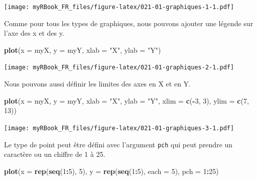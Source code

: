 \documentclass[]{book}
\newenvironment{Shaded}{\begin{snugshade}}{\end{snugshade}}
\newcommand{\DataTypeTok}[1]{\textcolor[rgb]{0.13,0.29,0.53}{#1}}
\newcommand{\DecValTok}[1]{\textcolor[rgb]{0.00,0.00,0.81}{#1}}
\newcommand{\KeywordTok}[1]{\textcolor[rgb]{0.13,0.29,0.53}{\textbf{#1}}}
\newcommand{\NormalTok}[1]{#1}
\newcommand{\OperatorTok}[1]{\textcolor[rgb]{0.81,0.36,0.00}{\textbf{#1}}}
\newcommand{\StringTok}[1]{\textcolor[rgb]{0.31,0.60,0.02}{#1}}
\begin{document}
\texttt{[image: myRBook\_FR\_files/figure-latex/021-01-graphiques-1-1.pdf]}

Comme pour tous les types de graphiques, nous pouvons ajouter une légende sur l'axe des x et des y.

\begin{Shaded}
\begin{Highlighting}[]
\KeywordTok{plot}\NormalTok{(}\DataTypeTok{x =}\NormalTok{ myX, }\DataTypeTok{y =}\NormalTok{ myY, }
  \DataTypeTok{xlab =} \StringTok{"X"}\NormalTok{, }\DataTypeTok{ylab =} \StringTok{"Y"}\NormalTok{)}
\end{Highlighting}
\end{Shaded}

\texttt{[image: myRBook\_FR\_files/figure-latex/021-01-graphiques-2-1.pdf]}

Nous pouvons aussi définir les limites des axes en X et en Y.

\begin{Shaded}
\begin{Highlighting}[]
\KeywordTok{plot}\NormalTok{(}\DataTypeTok{x =}\NormalTok{ myX, }\DataTypeTok{y =}\NormalTok{ myY, }
  \DataTypeTok{xlab =} \StringTok{"X"}\NormalTok{, }\DataTypeTok{ylab =} \StringTok{"Y"}\NormalTok{, }
  \DataTypeTok{xlim =} \KeywordTok{c}\NormalTok{(}\OperatorTok{-}\DecValTok{3}\NormalTok{, }\DecValTok{3}\NormalTok{), }\DataTypeTok{ylim =} \KeywordTok{c}\NormalTok{(}\DecValTok{7}\NormalTok{, }\DecValTok{13}\NormalTok{))}
\end{Highlighting}
\end{Shaded}

\texttt{[image: myRBook\_FR\_files/figure-latex/021-01-graphiques-3-1.pdf]}

Le type de point peut être défini avec l'argument \texttt{pch} qui peut prendre un caractère ou un chiffre de 1 à 25.

\begin{Shaded}
\begin{Highlighting}[]
\KeywordTok{plot}\NormalTok{(}\DataTypeTok{x =} \KeywordTok{rep}\NormalTok{(}\KeywordTok{seq}\NormalTok{(}\DecValTok{1}\OperatorTok{:}\DecValTok{5}\NormalTok{), }\DecValTok{5}\NormalTok{), }\DataTypeTok{y =} \KeywordTok{rep}\NormalTok{(}\KeywordTok{seq}\NormalTok{(}\DecValTok{1}\OperatorTok{:}\DecValTok{5}\NormalTok{), }\DataTypeTok{each =} \DecValTok{5}\NormalTok{),}
  \DataTypeTok{pch =} \DecValTok{1}\OperatorTok{:}\DecValTok{25}\NormalTok{)}
\end{Highlighting}
\end{Shaded}
\end{document}
